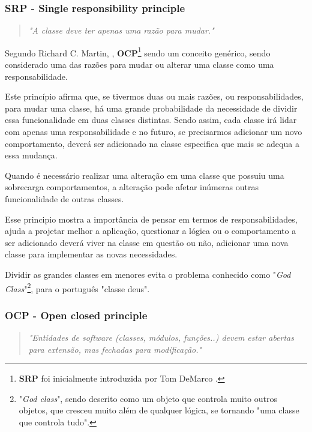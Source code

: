 \documentclass[12pt]{article}
\begin{document}
\subsubsection{SRP - Single responsibility principle}

\begin{quote}
	\textit{"A classe deve ter apenas uma razão para mudar."}
\end{quote}

Segundo Richard C. Martin, \cite{ROBERT_MARTIN_THE_CLEAN_ARCHITECTURE}, \textbf{OCP}\footnote{\textbf{SRP} foi inicialmente introduzida por Tom DeMarco \cite{SASS_SRP}.} sendo um conceito genérico, sendo considerado uma das razões para mudar ou alterar uma classe como uma responsabilidade. 

Este princípio afirma que, se tivermos duas ou mais razões, ou responsabilidades, para mudar uma classe, há uma grande probabilidade da necessidade de dividir essa funcionalidade em duas classes distintas. Sendo assim, cada classe irá lidar com apenas uma responsabilidade e no futuro, se precisarmos adicionar um novo comportamento, deverá ser adicionado na classe especifica que mais se adequa a essa mudança.

Quando é necessário realizar uma alteração em uma classe que possuiu uma sobrecarga comportamentos, a alteração pode afetar inúmeras outras funcionalidade de outras classes.

Esse principio mostra a importância de pensar em termos de responsabilidades, ajuda a projetar melhor a aplicação, questionar a lógica ou o comportamento a ser adicionado deverá viver na classe em questão ou não, adicionar uma nova classe para implementar as novas necessidades.

Dividir as grandes classes em menores evita o problema conhecido como "\textit{God Class}"\footnote{"\textit{God class}", sendo descrito como um objeto que controla muito outros objetos, que cresceu muito além de qualquer lógica, se tornando "uma classe que controla tudo".}\cite{GOD_CLASS}, para o português "classe deus". 


\subsubsection{OCP - Open closed principle}

\begin{quote}
	\textit{"Entidades de software (classes, módulos, funções..) devem estar abertas para extensão, mas fechadas para modificação."}	
\end{quote}
\end{document}

